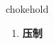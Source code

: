 
\begin{frame}
{\huge chokehold}
\begin{center}
\begin{enumerate}\Large
  \item \textbf{压制}
\end{enumerate}
\end{center}
\end{frame}
